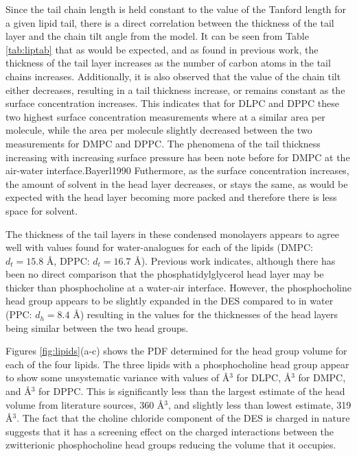 \documentclass[twoside,twocolumn,9pt]{article}
\begin{document}
Since the tail chain length is held constant to the value of the Tanford length for a given lipid tail, there is a direct correlation between the thickness of the tail layer and the chain tilt angle from the model. It can be seen from Table \ref{tab:liptab} that as would be expected, and as found in previous work,\cite{Mohwald1990,Vaknin1991} the thickness of the tail layer increases as the number of carbon atoms in the tail chains increases. Additionally, it is also observed that the value of the chain tilt either decreases, resulting in a tail thickness increase, or remains constant as the surface concentration increases. This indicates that for DLPC and DPPC these two highest surface concentration measurements where at a similar area per molecule, while the area per molecule slightly decreased between the two measurements for DMPC and DPPC. The phenomena of the tail thickness increasing with increasing surface pressure has been note before for DMPC at the air-water interface.{Bayerl1990} Futhermore, as the surface concentration increases, the amount of solvent in the head layer decreases, or stays the same, as would be expected with the head layer becoming more packed and therefore there is less space for solvent. 

The thickness of the tail layers in these condensed monolayers appears to agree well with values found for water-analogues for each of the lipids (DMPC: $d_t=15.8$ \AA,\cite{Johnson1991} DPPC: $d_t=16.7$ \AA\cite{Helm1987}). Previous work indicates, although there has been no direct comparison that the phosphatidylglycerol head layer may be thicker than phosphocholine at a water-air interface.\cite{Clifton2012,Johnson1991,Vaknin1991,Lawrie2000} However, the phosphocholine head group appears to be slightly expanded in the DES compared to in water (PPC: $d_h=8.4$ \AA\cite{Helm1987}) resulting in the values for the thicknesses of the head layers being similar between the two head groups. 

Figures \ref{fig:lipids}(a-c) shows the PDF determined for the head group volume for each of the four lipids. The three lipids with a phosphocholine head group appear to show some unsystematic variance with values of  \AA$^{3}$ for DLPC,  \AA$^{3}$ for DMPC, and  \AA$^{3}$ for DPPC. This is significantly less than the largest estimate of the head volume from literature sources, 360 \AA$^3$,\cite{Tardieu1973} and slightly less than lowest estimate, 319 \AA$^3$.\cite{Sun1994,Kucerka2004} The fact that the choline chloride component of the DES is charged in nature suggests that it has a screening effect on the charged interactions between the zwitterionic phosphocholine head groups reducing the volume that it occupies. 
\end{document}
